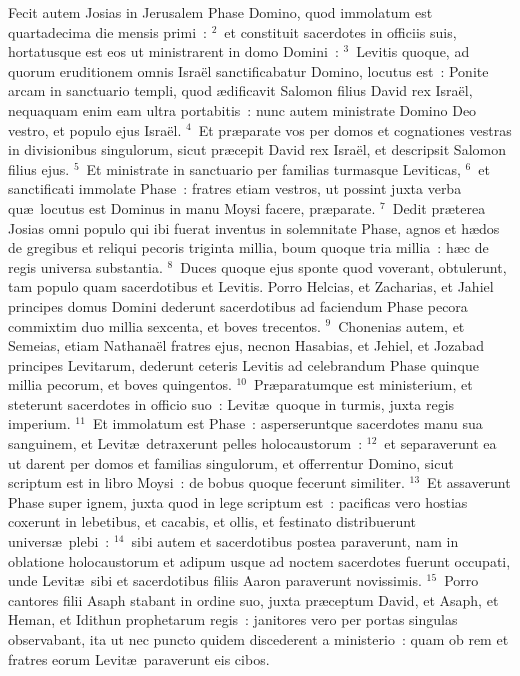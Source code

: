 \bchapter
\lettrine[lines=3,image=true,loversize=0.05,lraise=-0.03]{F}{}ecit autem Josias in Jerusalem Phase Domino, quod immolatum est quartadecima die mensis primi~:
${}^{2}$~et constituit sacerdotes in officiis suis, hortatusque est eos ut ministrarent in domo Domini~:
${}^{3}$~Levitis quoque, ad quorum eruditionem omnis Isra\"el sanctificabatur Domino, locutus est~: Ponite arcam in sanctuario templi, quod \ae dificavit Salomon filius David rex Isra\"el, nequaquam enim eam ultra portabitis~: nunc autem ministrate Domino Deo vestro, et populo ejus Isra\"el.
${}^{4}$~Et pr\ae parate vos per domos et cognationes vestras in divisionibus singulorum, sicut pr\ae cepit David rex Isra\"el, et descripsit Salomon filius ejus.
${}^{5}$~Et ministrate in sanctuario per familias turmasque Leviticas,
${}^{6}$~et sanctificati immolate Phase~: fratres etiam vestros, ut possint juxta verba qu\ae\ locutus est Dominus in manu Moysi facere, pr\ae parate.
${}^{7}$~Dedit pr\ae terea Josias omni populo qui ibi fuerat inventus in solemnitate Phase, agnos et h\ae dos de gregibus et reliqui pecoris triginta millia, boum quoque tria millia~: h\ae c de regis universa substantia.
${}^{8}$~Duces quoque ejus sponte quod voverant, obtulerunt, tam populo quam sacerdotibus et Levitis. Porro Helcias, et Zacharias, et Jahiel principes domus Domini dederunt sacerdotibus ad faciendum Phase pecora commixtim duo millia sexcenta, et boves trecentos.
${}^{9}$~Chonenias autem, et Semeias, etiam Nathana\"el fratres ejus, necnon Hasabias, et Jehiel, et Jozabad principes Levitarum, dederunt ceteris Levitis ad celebrandum Phase quinque millia pecorum, et boves quingentos.
${}^{10}$~Pr\ae paratumque est ministerium, et steterunt sacerdotes in officio suo~: Levit\ae\ quoque in turmis, juxta regis imperium.
${}^{11}$~Et immolatum est Phase~: asperseruntque sacerdotes manu sua sanguinem, et Levit\ae\ detraxerunt pelles holocaustorum~:
${}^{12}$~et separaverunt ea ut darent per domos et familias singulorum, et offerrentur Domino, sicut scriptum est in libro Moysi~: de bobus quoque fecerunt similiter.
${}^{13}$~Et assaverunt Phase super ignem, juxta quod in lege scriptum est~: pacificas vero hostias coxerunt in lebetibus, et cacabis, et ollis, et festinato distribuerunt univers\ae\ plebi~:
${}^{14}$~sibi autem et sacerdotibus postea paraverunt, nam in oblatione holocaustorum et adipum usque ad noctem sacerdotes fuerunt occupati, unde Levit\ae\ sibi et sacerdotibus filiis Aaron paraverunt novissimis.
${}^{15}$~Porro cantores filii Asaph stabant in ordine suo, juxta pr\ae ceptum David, et Asaph, et Heman, et Idithun prophetarum regis~: janitores vero per portas singulas observabant, ita ut nec puncto quidem discederent a ministerio~: quam ob rem et fratres eorum Levit\ae\ paraverunt eis cibos.
